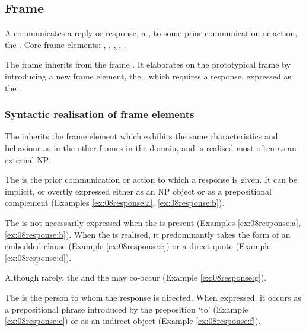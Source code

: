 \documentclass[output=paper,colorlinks,citecolor=brown]{langscibook}
\begin{document}
\subsection{Frame }  

\begin{description}[font=\normalfont]
\item[Definition of the frame \framename{Communication\_response}:] A  communicates a reply or response, a , to some prior communication or action, the . Core frame elements: , , , , .
\end{description}

The  frame inherits from the frame . It elaborates on the prototypical frame by introducing a new frame element, the , which requires a response, expressed as the . %

\subsubsection{Syntactic realisation of  frame elements}


The  inherits the frame element  which exhibits the same characteristics and behaviour as in the other frames in the domain, and is realised most often as an external NP. 

The  is the prior communication or action to which a response is given. It can be implicit, or overtly expressed either as an NP object or as a prepositional complement (Examples \ref{ex:08response:a}, \ref{ex:08response:b}).

The  is not necessarily expressed when the  is present (Examples \ref{ex:08response:a}, \ref{ex:08response:b}). When the  is realised, it predominantly takes the form of an embedded clause (Example \ref{ex:08response:c}) or a direct quote (Example \ref{ex:08response:d}).

Although rarely, the  and the  may co-occur (Example \ref{ex:08response:g}).

The  is the person to whom the response is directed. When expressed, it occurs as a prepositional phrase introduced by the preposition `to’ (Example \ref{ex:08response:e}) or as an indirect object (Example \ref{ex:08response:f}).
\end{document}
